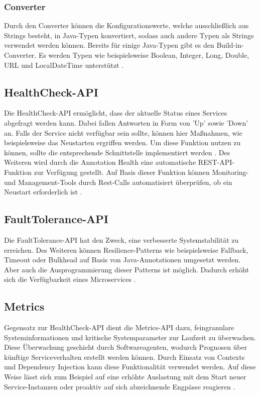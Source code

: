 \subsubsection{Converter}
Durch den Converter können die Konfigurationswerte, welche ausschließlich aus Strings besteht, in Java-Typen konvertiert, sodass auch andere Typen als Strings verwendet werden können. Bereits für einige Java-Typen gibt es den Build-in-Converter. Es werden Typen wie beispielsweise Boolean, Integer, Long, Double, URL und LocalDateTime unterstützt \cite{LarsRowekamp.2017}.

\subsection{HealthCheck-API} \label{healthcheck}
Die HealthCheck-API ermöglicht, dass der aktuelle Status eines Services abgefragt werden kann. Dabei fallen Antworten in Form von 'Up' sowie 'Down' an. Falls der Service nicht verfügbar sein sollte, können hier Maßnahmen, wie beispielsweise das Neustarten ergriffen werden. Um diese Funktion nutzen zu können, sollte die entsprechende Schnittstelle implementiert werden \cite{LarsRowekamp.2017}. Des Weiteren wird durch die Annotation  Health eine automatische REST-API-Funktion zur Verfügung gestellt. Auf Basis dieser Funktion können Monitoring- und Management-Tools durch Rest-Calls automatisiert überprüfen, ob ein Neustart erforderlich ist \cite{LarsRowekamp.2017c}.  

\subsection{FaultTolerance-API} \label{faulttolerance}
Die FaultTolerance-API hat den Zweck, eine verbesserte Systemstabilität zu erreichen. Des Weiteren können Resilience-Patterns wie beispielsweise Fallback, Timeout oder Bulkhead auf Basis von Java-Annotationen umgesetzt werden. Aber auch die Ausprogrammierung dieser Patterns ist möglich. Dadurch erhöht sich die Verfügbarkeit eines Microservices \cite{ibm.2017}.

\subsection{Metrics}
Gegensatz zur HealthCheck-API dient die Metrics-API dazu, feingranulare Systeminformationen und kritische Systemparameter zur Laufzeit zu überwachen. Diese Überwachung geschieht durch Softwareagenten, wodurch Prognosen über künftige Serviceverhalten erstellt werden können. Durch Einsatz von Contexts und Dependency Injection kann diese Funktionalität verwendet werden. Auf diese Weise lässt sich zum Beispiel auf eine erhöhte Auslastung mit dem Start neuer Service-Instanzen oder proaktiv auf sich abzeichnende Engpässe reagieren \cite{LarsRowekamp.2017c}. 

